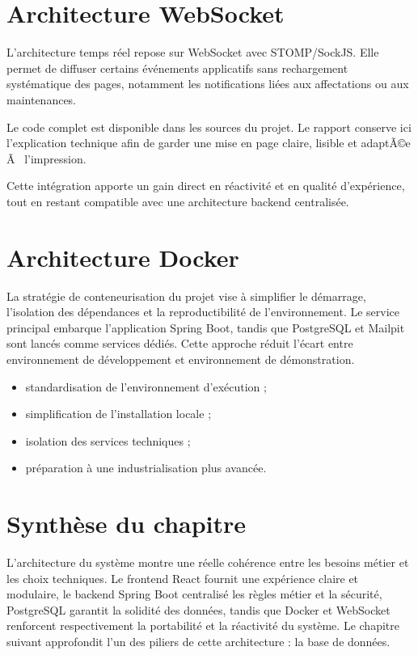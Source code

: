 ﻿\documentclass[12pt,a4paper,oneside]{report}
\newenvironment{codeblock}[1][]{
  \par
  \captionsetup{type=figure}
}{
  \par
}
\begin{document}
\section{Architecture WebSocket}
L'architecture temps réel repose sur WebSocket avec STOMP/SockJS. Elle permet de diffuser certains événements applicatifs sans rechargement systématique des pages, notamment les notifications liées aux affectations ou aux maintenances.

\begin{codeblock}[H]
\caption{Configuration WebSocket}
\begin{keybox}
Le code complet est disponible dans les sources du projet. Le rapport conserve ici l'explication technique afin de garder une mise en page claire, lisible et adaptÃ©e Ã  l'impression.
\end{keybox}
\end{codeblock}

Cette intégration apporte un gain direct en réactivité et en qualité d'expérience, tout en restant compatible avec une architecture backend centralisée.

\section{Architecture Docker}
La stratégie de conteneurisation du projet vise à simplifier le démarrage, l'isolation des dépendances et la reproductibilité de l'environnement. Le service principal embarque l'application Spring Boot, tandis que PostgreSQL et Mailpit sont lancés comme services dédiés. Cette approche réduit l'écart entre environnement de développement et environnement de démonstration.

\begin{methodbox}
\begin{itemize}
  \item standardisation de l'environnement d'exécution ;
  \item simplification de l'installation locale ;
  \item isolation des services techniques ;
  \item préparation à une industrialisation plus avancée.
\end{itemize}
\end{methodbox}

\section{Synthèse du chapitre}
L'architecture du système montre une réelle cohérence entre les besoins métier et les choix techniques. Le frontend React fournit une expérience claire et modulaire, le backend Spring Boot centralisé les règles métier et la sécurité, PostgreSQL garantit la solidité des données, tandis que Docker et WebSocket renforcent respectivement la portabilité et la réactivité du système. Le chapitre suivant approfondit l'un des piliers de cette architecture : la base de données.
\end{document}
